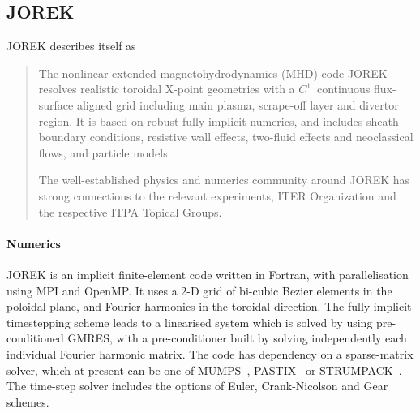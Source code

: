 \subsection{JOREK}\label{sec:jorek}


JOREK \cite{JOREK,Huysmans2007,Czarny2008} describes itself as
\begin{quote}
The nonlinear extended magnetohydrodynamics (MHD) code JOREK resolves realistic toroidal X-point 
geometries with a $C^1$~continuous flux-surface aligned grid including main 
plasma, scrape-off layer and divertor region. It is based on robust fully 
implicit numerics, and includes sheath boundary conditions, resistive wall 
effects, two-fluid effects and neoclassical flows, and particle models.

The well-established physics and numerics community around JOREK has strong 
connections to the relevant experiments, ITER Organization and the respective 
ITPA Topical Groups.
\end{quote}

%

\paragraph{Numerics}

JOREK is an implicit finite-element code written in Fortran, with 
parallelisation using MPI and OpenMP. It uses a 2-D grid of bi-cubic Bezier 
elements in the poloidal plane, and Fourier harmonics in the toroidal 
direction. The fully implicit timestepping scheme leads to a linearised
system which is solved by using pre-conditioned GMRES,
with a pre-conditioner built by solving independently each individual Fourier 
harmonic matrix. The code has dependency on a sparse-matrix solver, which at 
present can be one of MUMPS~\cite{MUMPS}, PASTIX~\cite{PASTIX} or STRUMPACK~\cite{STRUMPACK}.
The time-step solver includes the options of Euler, Crank-Nicolson and Gear schemes.

